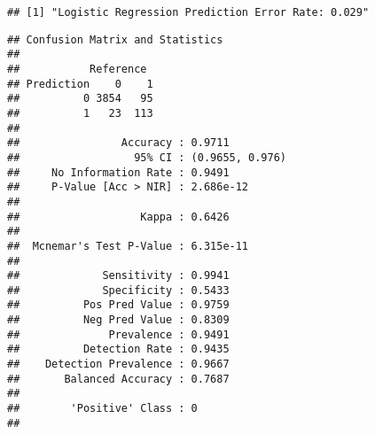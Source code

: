 \documentclass[
]{article}
\newenvironment{Shaded}{\begin{snugshade}}{\end{snugshade}}
\newcommand{\AttributeTok}[1]{\textcolor[rgb]{0.13,0.29,0.53}{#1}}
\newcommand{\CommentTok}[1]{\textcolor[rgb]{0.56,0.35,0.01}{\textit{#1}}}
\newcommand{\DecValTok}[1]{\textcolor[rgb]{0.00,0.00,0.81}{#1}}
\newcommand{\FloatTok}[1]{\textcolor[rgb]{0.00,0.00,0.81}{#1}}
\newcommand{\FunctionTok}[1]{\textcolor[rgb]{0.13,0.29,0.53}{\textbf{#1}}}
\newcommand{\NormalTok}[1]{#1}
\newcommand{\OtherTok}[1]{\textcolor[rgb]{0.56,0.35,0.01}{#1}}
\newcommand{\SpecialCharTok}[1]{\textcolor[rgb]{0.81,0.36,0.00}{\textbf{#1}}}
\newcommand{\StringTok}[1]{\textcolor[rgb]{0.31,0.60,0.02}{#1}}
\begin{document}
\begin{Shaded}
\end{Shaded}

\begin{verbatim}
## [1] "Logistic Regression Prediction Error Rate: 0.029"
\end{verbatim}

\begin{Shaded}
\end{Shaded}

\begin{verbatim}
## Confusion Matrix and Statistics
## 
##           Reference
## Prediction    0    1
##          0 3854   95
##          1   23  113
##                                          
##                Accuracy : 0.9711         
##                  95% CI : (0.9655, 0.976)
##     No Information Rate : 0.9491         
##     P-Value [Acc > NIR] : 2.686e-12      
##                                          
##                   Kappa : 0.6426         
##                                          
##  Mcnemar's Test P-Value : 6.315e-11      
##                                          
##             Sensitivity : 0.9941         
##             Specificity : 0.5433         
##          Pos Pred Value : 0.9759         
##          Neg Pred Value : 0.8309         
##              Prevalence : 0.9491         
##          Detection Rate : 0.9435         
##    Detection Prevalence : 0.9667         
##       Balanced Accuracy : 0.7687         
##                                          
##        'Positive' Class : 0              
## 
\end{verbatim}
\end{document}
